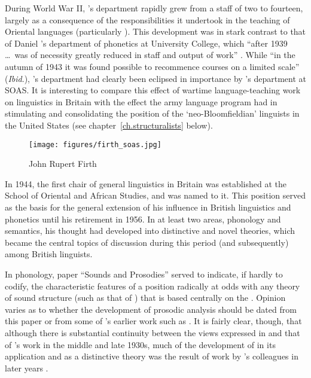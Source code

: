 During World War II, {\Firth}'s department rapidly grew from a staff of
two to fourteen, largely as a consequence of the responsibilities it
undertook in the teaching of Oriental languages (particularly
). This development was in stark {contrast} to that of Daniel
{\Jones}'s department of phonetics at University College, which ``after
1939 \ldots\ was of necessity greatly reduced in staff and output of
work'' \citep{jones48:london.school}. While ``in the autumn of 1943 it
was found possible to recommence courses on a limited scale''
(\emph{Ibid}.), {\Jones}'s department had clearly been eclipsed in
importance by {\Firth}'s department at SOAS. It is interesting to compare
this effect of wartime language-teaching work on linguistics in
Britain with the effect the army language program had in stimulating
and consolidating the position of the `neo-Bloomfieldian' linguists in
the United States (see chapter~\ref{ch.structuralists} below).

\begin{wrapfigure}{r}{.4\textwidth}
  \texttt{[image: figures/firth\_soas.jpg]}
  \caption{John Rupert Firth}
  \label{fig:ch.firth.firth_soas}
\end{wrapfigure}
In 1944, the first chair of general linguistics in Britain was
established at the School of Oriental and African Studies, and {\Firth}
was named to it. This position served as the basis for the general
extension of his influence in British linguistics and phonetics until
his retirement in 1956. In at least two areas, phonology and
semantics, his thought had developed into distinctive and novel
theories, which became the central topics of discussion during this
period (and subsequently) among British linguists.

In phonology,  paper ``Sounds and
Prosodies'' served to indicate, if hardly to codify, the characteristic
features of a position radically at odds with any theory of sound
structure (such as that of ) that is based centrally on
the . Opinion varies as to whether the development of prosodic
analysis should be dated from this paper or from some of {\Firth}'s
earlier work such as \citet{firth.rogers37:hunanese}. It is fairly
clear, though, that although there is substantial continuity between
the views expressed in \citealt{firth48:sounds:prosodies} and that of
{\Firth}'s work in the middle and late 1930s, much of the development of
 in its application and as a distinctive theory was
the result of work by {\Firth}'s colleagues in later years
\citep{coleman04:firth.1930s,battaner-moro06:firth.1930s}.

